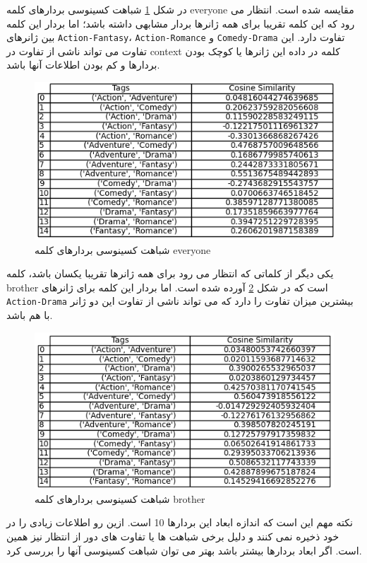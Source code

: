 در شکل 
\ref{fig12}
شباهت کسینوسی بردارهای کلمه
everyone
مقایسه شده است. انتظار می رود که این کلمه تقریبا برای همه ژانرها بردار مشابهی داشته باشد؛ اما بردار این کلمه بین ژانرهای 
\texttt{Action-Fantasy}،
\texttt{Action-Romance}
و
\texttt{Comedy-Drama}
تفاوت دارد. این تفاوت می تواند ناشی از تفاوت در context کلمه در داده این ژانرها یا کوچک بودن بردارها و کم بودن اطلاعات آنها باشد.
 \begin{figure}[H]
	\centering
	
	\includegraphics[width=1\textwidth,height=1\textheight,keepaspectratio]{../reports/word2vec/everyone}
	\caption{شباهت کسینوسی بردارهای کلمه everyone}
	\label{fig12}
	
\end{figure} 

یکی دیگر از کلماتی که انتظار می رود برای همه ژانرها تقریبا یکسان باشد، کلمه brother است که در شکل
\ref{fig13}
آورده شده است. اما بردار این کلمه برای ژانرهای
\texttt{Action-Drama}
بیشترین میزان تفاوت را دارد که می تواند ناشی از تفاوت این دو ژانر با هم باشد.


 \begin{figure}[H]
	\centering
	
	\includegraphics[width=1\textwidth,height=1\textheight,keepaspectratio]{../reports/word2vec/brother}
	\caption{شباهت کسینوسی بردارهای کلمه brother}
	\label{fig13}
	
\end{figure} 



نکته مهم این است که اندازه ابعاد این بردارها 10 است. ازین رو اطلاعات زیادی را در خود ذخیره نمی کنند و دلیل برخی شباهت ها یا تفاوت های دور از انتظار نیز همین است. اگر ابعاد بردارها بیشتر باشد بهتر می توان شباهت کسینوسی آنها را بررسی کرد.